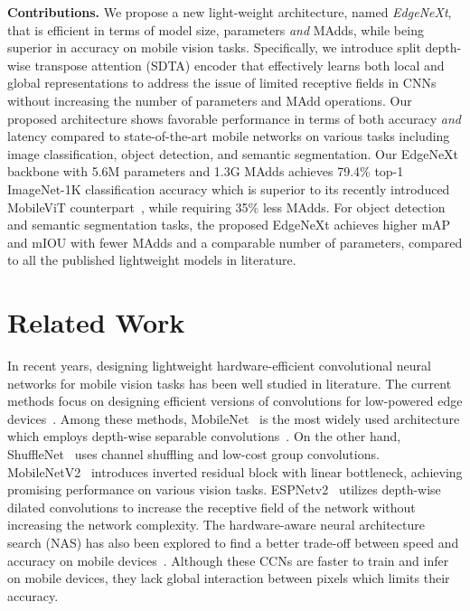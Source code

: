 \documentclass[runningheads]{llncs}
\begin{document}
\noindent\textbf{Contributions.} We propose a new light-weight architecture, named \textit{EdgeNeXt}, that is efficient in terms of model size, parameters \textit{and} MAdds, while being superior in accuracy on mobile vision tasks. Specifically, we introduce split depth-wise transpose
attention (SDTA) encoder that effectively learns both local and global representations to address the issue of limited receptive fields in CNNs without increasing the number of parameters and MAdd operations. Our proposed architecture shows favorable performance in terms of both accuracy \textit{and} latency compared to state-of-the-art mobile networks on various tasks including image classification, object detection, and semantic segmentation. Our EdgeNeXt backbone with 5.6M parameters and 1.3G MAdds achieves 79.4\% top-1 ImageNet-1K classification accuracy which is superior to its recently introduced MobileViT counterpart~\cite{MobileViT}, while requiring 35\% less MAdds. For object detection and semantic segmentation tasks, the proposed EdgeNeXt achieves higher mAP and mIOU with fewer MAdds and a comparable number of parameters, compared to all the published lightweight models in literature.



\section{Related Work}
In recent years, designing lightweight hardware-efficient convolutional neural networks for mobile vision tasks has been well studied in literature. 
The current methods focus on designing efficient versions of convolutions for low-powered edge devices~\cite{squeezenet,MobileNet}.
Among these methods, MobileNet~\cite{MobileNet} is the most widely used architecture which employs depth-wise separable convolutions~\cite{DepthWiseConv}. On the other hand, ShuffleNet~\cite{ShuffleNet} uses channel shuffling and low-cost group convolutions. MobileNetV2~\cite{MobileNetV2} introduces inverted residual block with linear bottleneck, achieving promising performance on various vision tasks. ESPNetv2~\cite{espnetv2} utilizes depth-wise dilated convolutions to increase the receptive field of the network without increasing the network complexity. 
The hardware-aware neural architecture search (NAS) has also been explored to find a better trade-off between speed and accuracy on mobile devices~\cite{MobileNetV3,mnasnet}.
Although these CCNs are faster to train and infer on mobile devices, they lack global interaction between pixels which limits their accuracy.
\end{document}
